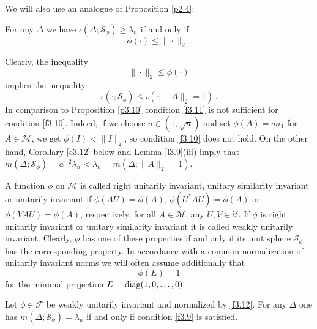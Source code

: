 \documentclass{amsart}
\begin{document}
We will also use an analogue of Proposition \ref{p2.4}: 

\begin{pro} \label{p3.10}
For any $\Delta$ we have $\iota(\Delta; {\mathcal S}_\phi) \geq \lambda_n$     if and only if
\begin{equation} \label{f3.9}
      \phi( \cdot ) \leq \| \cdot \|_2  \, .
\end{equation}
\end{pro}

\begin{rmk} \label{r3.11}
Clearly, the inequality
\begin{equation}  \label{f3.10}
     \| \cdot \|_2 \leq \phi( \cdot )
\end{equation}
implies the inequality
\begin{equation}    \label{f3.11}
     \iota( \cdot ; {\mathcal S}_\phi ) \leq \iota( \cdot ; \|A\|_2=1 ) \, .
\end{equation}
In comparison to Proposition \ref{p3.10} condition \eqref{f3.11} is not sufficient for condition \eqref{f3.10}. Indeed, if we choose $a \in (1, \sqrt{n})$ and set $\phi(A)=a \sigma_1$ for $A \in \mathcal M$, we get $\phi(I) < \|I\|_2$, so condition \eqref{f3.10}  does not hold. On the other hand, Corollary \ref{c3.12} below and Lemma \ref{l3.9}(iii)  imply that $m(\Delta ; {\mathcal S}_\phi) = a^{-2} \lambda_n < \lambda_n = m(\Delta ; \|A\|_2 =1)$. 
\end{rmk}

A function $\phi$ on $\mathcal M$ is called right unitarily invariant, unitary similarity invariant or unitarily invariant if  $\phi(AU)=\phi(A)$, $\phi(U^*AU) = \phi(A)$ or $\phi(VAU) = \phi(A)$, respectively, for all $A \in \mathcal M$, any $U,V \in \mathcal U$. If $\phi$ is right unitarily invariant or unitary similarity invariant it is called weakly unitarily invariant. Clearly, $\phi$ has one of these properties if and only if its unit sphere ${\mathcal S}_\phi$ has the corresponding property. In accordance with a common normalization of unitarily invariant norms we will often assume additionally that 
\begin{equation} \label{f3.12}
      \phi(E)=1
\end{equation}      
for the minimal projection $E = {\rm diag}(1,0,\ldots,0)$. 

\begin{cor} \label{c3.12}
   Let $\phi \in \mathcal F$ be weakly unitarily invariant and normalized by \eqref{f3.12}. For any $\Delta$ one has $m(\Delta ; {\mathcal S}_\phi) = \lambda_n$ if and only if condition \eqref{f3.9} is satisfied.
\end{cor}
   
\end{document}

